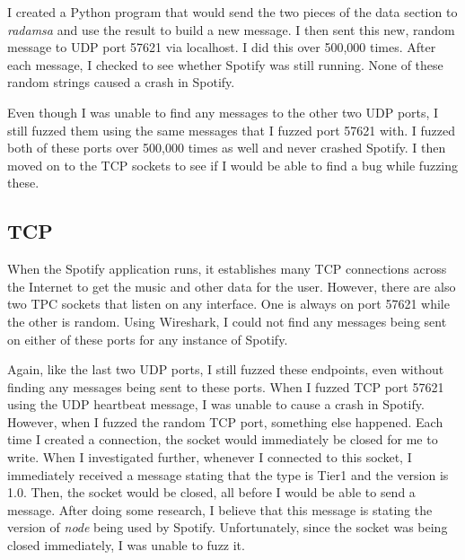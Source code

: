 I created a Python program that would send the two pieces of the data section to \textit{radamsa} and use the result to build a new message.  I then sent this new, random message to UDP port 57621 via localhost.  I did this over 500,000 times.  After each message, I checked to see whether Spotify was still running.  None of these random strings caused a crash in Spotify.

Even though I was unable to find any messages to the other two UDP ports, I still fuzzed them using the same messages that I fuzzed port 57621 with.  I fuzzed both of these ports over 500,000 times as well and never crashed Spotify.  I then moved on to the TCP sockets to see if I would be able to find a bug while fuzzing these.

\subsection{TCP}
\label{sec:spotifyTcp}
When the Spotify application runs, it establishes many TCP connections across the Internet to get the music and other data for the user.  However, there are also two TPC sockets that listen on any interface.  One is always on port 57621 while the other is random.  Using Wireshark, I could not find any messages being sent on either of these ports for any instance of Spotify.

Again, like the last two UDP ports, I still fuzzed these endpoints, even without finding any messages being sent to these ports.  When I fuzzed TCP port 57621 using the UDP heartbeat message, I was unable to cause a crash in Spotify.  However, when I fuzzed the random TCP port, something else happened.  Each time I created a connection, the socket would immediately be closed for me to write.  When I investigated further, whenever I connected to this socket, I immediately received a message stating that the type is Tier1 and the version is 1.0.  Then, the socket would be closed, all before I would be able to send a message.  After doing some research, I believe that this message is stating the version of \textit{node} being used by Spotify.  Unfortunately, since the socket was being closed immediately, I was unable to fuzz it.

